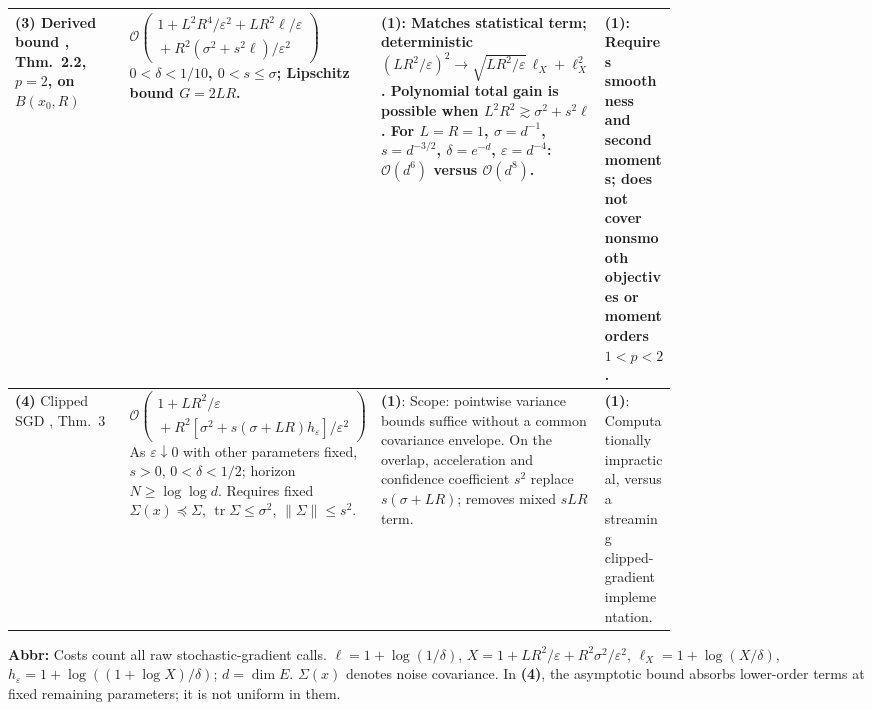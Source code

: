 \begin{table}[tp]
\begin{threeparttable}
\begin{tabularx}{\linewidth}{@{}>{\raggedright\arraybackslash}p{0.20\linewidth}>{\raggedright\arraybackslash}p{0.32\linewidth}>{\raggedright\arraybackslash}p{0.25\linewidth}>{\raggedright\arraybackslash}X@{}}
\midrule
\textbf{(3)} Derived bound \citep{cscZhang2026v2}, Thm.~2.2, $p=2$, on $B(x_0,R)$ &
$\mathcal{O}\!\left(\begin{gathered}1+L^2R^4/\varepsilon^2+LR^2\ell/\varepsilon\\{}+R^2(\sigma^2+s^2\ell)/\varepsilon^2\end{gathered}\right)$\newline $0<\delta<1/10$, $0<s\le\sigma$; Lipschitz bound $G=2LR$. &
\textbf{(1)}: Matches statistical term; deterministic $(LR^2/\varepsilon)^2\to\sqrt{LR^2/\varepsilon}\,\ell_X+\ell_X^2$. Polynomial total gain is possible when $L^2R^2\gtrsim\sigma^2+s^2\ell$. For $L=R=1$, $\sigma=d^{-1}$, $s=d^{-3/2}$, $\delta=e^{-d}$, $\varepsilon=d^{-4}$: $\mathcal{O}(d^6)$ versus $\mathcal{O}(d^8)$. &
\textbf{(1)}: Requires smoothness and second moments; does not cover nonsmooth objectives or moment orders $1<p<2$. \\
\midrule
\textbf{(4)} Clipped SGD \citep{cscDas2024v1}, Thm.~3 &
$\mathcal{O}\!\left(\begin{gathered}1+LR^2/\varepsilon\\{}+R^2[\sigma^2+s(\sigma+LR)h_\varepsilon]/\varepsilon^2\end{gathered}\right)$\newline As $\varepsilon\downarrow0$ with other parameters fixed, $s>0$, $0<\delta<1/2$; horizon $N\ge\log\log d$. Requires fixed $\Sigma(x)\preceq\Sigma$, $\operatorname{tr}\Sigma\le\sigma^2$, $\|\Sigma\|\le s^2$. &
\textbf{(1)}: Scope: pointwise variance bounds suffice without a common covariance envelope. On the overlap, acceleration and confidence coefficient $s^2$ replace $s(\sigma+LR)$; removes mixed $sLR$ term. &
\textbf{(1)}: Computationally impractical, versus a streaming clipped-gradient implementation. \\
\bottomrule
\end{tabularx}
\begin{tablenotes}[flushleft]\footnotesize
\item[] \textbf{Abbr:} Costs count all raw stochastic-gradient calls. $\ell=1+\log(1/\delta)$, $X=1+LR^2/\varepsilon+R^2\sigma^2/\varepsilon^2$, $\ell_X=1+\log(X/\delta)$, $h_\varepsilon=1+\log((1+\log X)/\delta)$; $d=\dim E$. $\Sigma(x)$ denotes noise covariance. In \textbf{(4)}, the asymptotic bound absorbs lower-order terms at fixed remaining parameters; it is not uniform in them.
\end{tablenotes}
\end{threeparttable}
\end{table}
\clearpage

